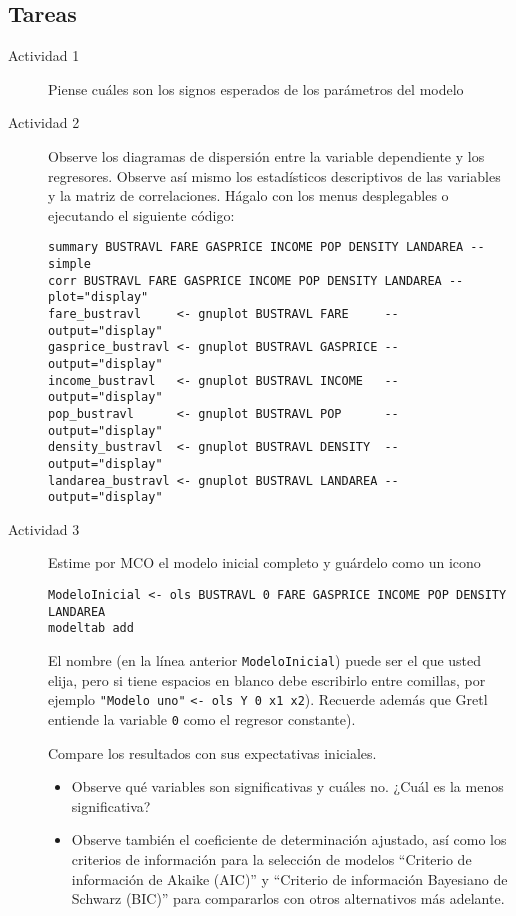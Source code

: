 \documentclass[11pt]{article}
\begin{document}
\subsection{Tareas}
\label{sec:org0b524f9}

\begin{description}
\item[{Actividad 1}] Piense cuáles son los signos esperados de los parámetros del modelo

\item[{Actividad 2}] Observe los diagramas de dispersión entre la variable
dependiente y los regresores. Observe así mismo los estadísticos
descriptivos de las variables y la matriz de correlaciones. Hágalo
con los menus desplegables o ejecutando el siguiente código:
\begin{verbatim}
summary BUSTRAVL FARE GASPRICE INCOME POP DENSITY LANDAREA --simple
corr BUSTRAVL FARE GASPRICE INCOME POP DENSITY LANDAREA --plot="display"  
fare_bustravl     <- gnuplot BUSTRAVL FARE     --output="display"
gasprice_bustravl <- gnuplot BUSTRAVL GASPRICE --output="display"
income_bustravl   <- gnuplot BUSTRAVL INCOME   --output="display"
pop_bustravl      <- gnuplot BUSTRAVL POP      --output="display"
density_bustravl  <- gnuplot BUSTRAVL DENSITY  --output="display"
landarea_bustravl <- gnuplot BUSTRAVL LANDAREA --output="display"
\end{verbatim}

\item[{Actividad 3}] Estime por MCO el modelo inicial completo y guárdelo como un icono
\begin{verbatim}
ModeloInicial <- ols BUSTRAVL 0 FARE GASPRICE INCOME POP DENSITY LANDAREA
modeltab add
\end{verbatim}
El nombre (en la línea anterior \texttt{ModeloInicial}) puede ser el que
usted elija, pero si tiene espacios en blanco debe escribirlo entre
comillas, por ejemplo \texttt{"Modelo uno"} \texttt{<- ols Y 0 x1 x2}). Recuerde
además que Gretl entiende la variable \texttt{0} como el regresor
constante).

Compare los resultados con sus expectativas iniciales.

\begin{itemize}
\item Observe qué variables son significativas y cuáles no. ¿Cuál es la
menos significativa?

\item Observe también el coeficiente de determinación ajustado, así como
los criterios de información para la selección de modelos
``Criterio de información de Akaike (AIC)'' y ``Criterio de
información Bayesiano de Schwarz (BIC)'' para compararlos con
otros alternativos más adelante.
\end{itemize}


\end{description}
\end{document}
